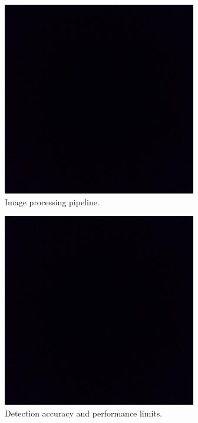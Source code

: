 \documentclass[12pt, letterpaper]{article}
\begin{document}
\begin{figure}[htb]
\center
\includegraphics{bbox.jpeg}
\caption{Image processing pipeline.}
\label{fig:pipeline}
\end{figure}

\begin{figure}[htb]
\center
\includegraphics{bbox.jpeg}
\caption{Detection accuracy and performance limits.}
\label{fig:limit}
\end{figure}

\vspace{.6in}

\end{document}
